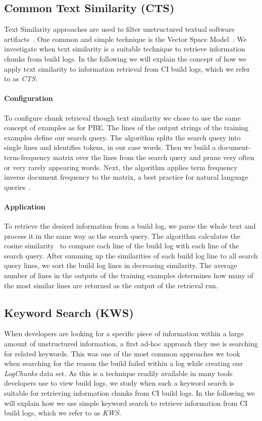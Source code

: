 \documentclass[\myrootdir/main.tex]{subfiles}
\begin{document}
\subsection{Common Text Similarity (CTS)}
\label{sec:expl-ts}
Text Similarity approaches are used to filter unstructured textual software artifacts~\cite{runeson2007detection,marcus2005recovery,antoniol2002recovering,mccarey2006recommending}.
One common and simple technique is the Vector Space Model~\cite{schutze2008introduction}.
We investigate when text similarity is a suitable technique to retrieve information chunks from build logs.
In the following we will explain the concept of how we apply text similarity to information retrieval from CI build logs, which we refer to as \emph{CTS}\@.

\paragraph{Configuration}
To configure chunk retrieval though text similarity we chose to use the same concept of examples as for PBE\@.
The lines of the output strings of the training examples define our search query.
The algorithm splits the search query into single lines and identifies tokens, in our case words.
Then we build a document-term-frequency matrix over the lines from the search query and prune very often or very rarely appearing words.
Next, the algorithm applies term frequency inverse document frequency to the matrix, a best practice for natural language queries~\cite{lee1997document}.

\paragraph{Application}
To retrieve the desired information from a build log, we parse the whole text and process it in the same way as the search query.
The algorithm calculates the cosine similarity~\cite{korenius2007principal} to compare each line of the build log with each line of the search query.
After summing up the similarities of each build log line to all search query lines, we sort the build log lines in decreasing similarity.
The average number of lines in the outputs of the training examples determines how many of the most similar lines are returned as the output of the retrieval run.

\subsection{Keyword Search (KWS)}
\label{sec:expl-skws}
When developers are looking for a specific piece of information within a large amount of unstructured information, a first ad-hoc approach they use is searching for related keywords.
This was one of the most common approaches we took when searching for the reason the build failed within a log while creating our \emph{LogChunks} data set.
As this is a technique readily available in many tools developers use to view build logs, we study when such a keyword search is suitable for retrieving information chunks from CI build logs.
In the following we will explain how we use simple keyword search to retrieve information from CI build logs, which we refer to as \emph{KWS}\@.
\end{document}
